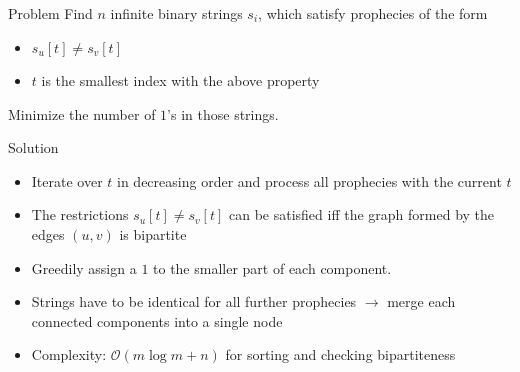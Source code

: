 \begin{frame}
    \frametitle{\problemtitle}
    \begin{block}{Problem}
        Find $n$ infinite binary strings $s_i$, which satisfy prophecies of the form
        \begin{itemize}
            \item $s_u[t] \neq s_v[t]$ 
            \item $t$ is the smallest index with the above property
        \end{itemize}
        Minimize the number of $1$'s in those strings.
    \end{block}
    \begin{block}{Solution}
        \begin{itemize}
            \item<+-> Iterate over $t$ in decreasing order and process all prophecies with the current $t$
            \item<+-> The restrictions $s_u[t] \neq s_v[t]$ can be satisfied iff the graph formed by the edges $(u,v)$ is bipartite
            \item<+-> Greedily assign a $1$ to the smaller part of each component.
            \item<+-> Strings have to be identical for all further prophecies $\rightarrow$ merge each connected components into a single node
            \item<+-> Complexity: $\mathcal{O}(m\log m+n)$ for sorting and checking bipartiteness
        \end{itemize}
    \end{block}
\end{frame}
